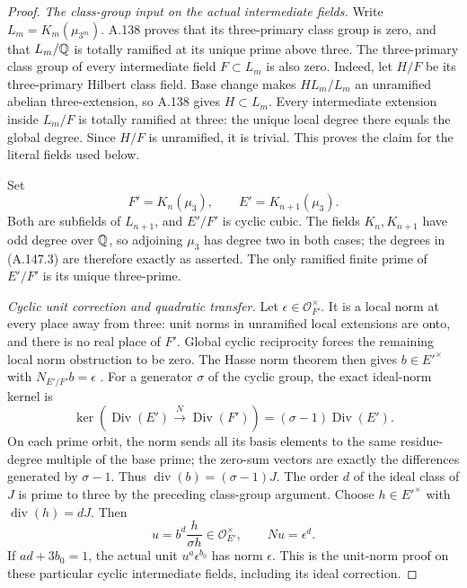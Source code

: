 \begin{proof}
\emph{The class-group input on the actual intermediate fields.}
Write \(L_m=K_m(\mu_{3^m})\).
A.138 proves that its three-primary class group is zero,
and that \(L_m/\mathbb Q\) is totally ramified at its unique
prime above three.
The three-primary class group of every intermediate
field \(F\subset L_m\) is also zero.
Indeed, let \(H/F\) be its three-primary Hilbert class
field.  Base change makes \(HL_m/L_m\) an unramified
abelian three-extension, so A.138 gives \(H\subset L_m\).
Every intermediate extension inside \(L_m/F\) is
totally ramified at three: the unique local degree
there equals the global degree.
Since \(H/F\) is unramified, it is trivial.
This proves the claim for the literal fields used below.

Set
\[
 F'=K_n(\mu_3),\qquad E'=K_{n+1}(\mu_3).
\tag{A.147.3}
\]
Both are subfields of \(L_{n+1}\), and
\(E'/F'\) is cyclic cubic.
The fields \(K_n,K_{n+1}\) have odd degree over
\(\mathbb Q\), so adjoining \(\mu_3\) has degree two
in both cases; the degrees in (A.147.3) are therefore
exactly as asserted.
The only ramified finite prime of \(E'/F'\) is its
unique three-prime.

\emph{Cyclic unit correction and quadratic transfer.}
Let \(\epsilon\in\mathcal O_{F'}^\times\).
It is a local norm at every place away from three:
unit norms in unramified local extensions are onto,
and there is no real place of \(F'\).
Global cyclic reciprocity forces the remaining local
norm obstruction to be zero.
The Hasse norm theorem then gives
\(b\in E'^\times\) with \(N_{E'/F'}b=\epsilon\)
\cite[Chapter V, Theorem 5.3; Chapter VIII, Theorem 3.1]{MilneCFT}.
For a generator \(\sigma\) of the cyclic group,
the exact ideal-norm kernel is
\[
 \ker(\operatorname{Div}(E')\xrightarrow{N}\operatorname{Div}(F'))
                         =(\sigma-1)\operatorname{Div}(E').
\tag{A.147.4}
\]
On each prime orbit, the norm sends all its basis
elements to the same residue-degree multiple of the
base prime; the zero-sum vectors are exactly the
differences generated by \(\sigma-1\).
Thus \(\operatorname{div}(b)=(\sigma-1)J\).
The order \(d\) of the ideal class of \(J\) is prime
to three by the preceding class-group argument.
Choose \(h\in E'^\times\) with
\(\operatorname{div}(h)=dJ\).
Then
\[
 u=b^d\frac{h}{\sigma h}\in\mathcal O_{E'}^\times,
                         \qquad Nu=\epsilon^d.
\tag{A.147.5}
\]
If \(ad+3b_0=1\), the actual unit
\(u^a\epsilon^{b_0}\) has norm \(\epsilon\).
This is the unit-norm proof on these particular cyclic
intermediate fields, including its ideal correction.


\end{proof}

